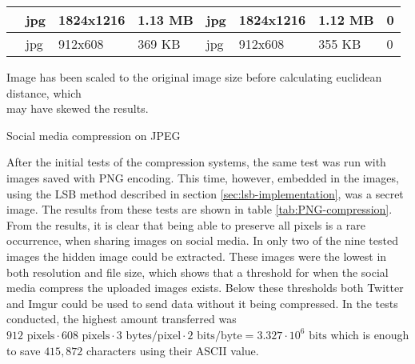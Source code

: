 \begin{threeparttable}[]
{\begin{tabular}{|p{1.7cm}|p{1.3cm}|p{1.9cm}|p{1.5cm}|p{1.3cm}|p{1.9cm}|p{1.5cm}|p{2cm}|}
               & jpg          & 1824x1216        & 1.13 MB    & jpg          & 1824x1216        & 1.12 MB    & 0                  \\ \hline
               & jpg          & 912x608          & 369 KB     & jpg          & 912x608          & 355 KB     & 0                  \\ \hline
\end{tabular}
}
\begin{tablenotes}
    \footnotesize{\item[\textdagger] Image has been scaled to the original image size before calculating euclidean distance, which\\ may have skewed the results.}
    \end{tablenotes}
\caption{Social media compression on JPEG}
\label{tab:JPEG-compression}
\end{threeparttable}


After the initial tests of the compression systems, the same test was run with images saved with PNG encoding.
This time, however, embedded in the images, using the LSB method described in section \ref{sec:lsb-implementation}, was a secret image. 
The results from these tests are shown in table \ref{tab:PNG-compression}.
From the results, it is clear that being able to preserve all pixels is a rare occurrence, when sharing images on social media.
In only two of the nine tested images the hidden image could be extracted.
These images were the lowest in both resolution and file size, which shows that a threshold for when the social media compress the uploaded images exists. 
Below these thresholds both Twitter and Imgur could be used to send data without it being compressed. 
In the tests conducted, the highest amount transferred was $912\text{ pixels} \cdot 608\text{ pixels} \cdot 3\text{ bytes/pixel} \cdot 2\text{ bits/byte} = 3.327\cdot 10^6\text{ bits}$ which is enough to save $415,872$ characters using their ASCII value.\\ 


